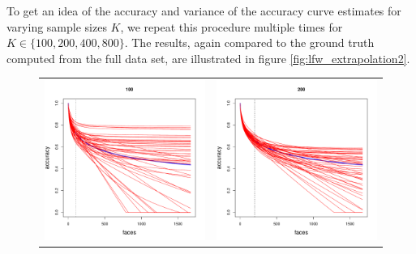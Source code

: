 \documentclass[12pt]{article}
\begin{document}
To get an idea of the accuracy and variance of the accuracy curve
estimates for varying sample sizes $K$, we repeat this procedure
multiple times for $K \in \{100,200,400, 800\}$.  The results, again
compared to the ground truth computed from the full data set, are
illustrated in figure \ref{fig:lfw_extrapolation2}.

\begin{figure}
\centering
\begin{tabular}{cc}
\includegraphics[scale = 0.4]{sub_100.pdf} &
\includegraphics[scale = 0.4]{sub_200.pdf} \\

\end{tabular}
\end{figure}
\end{document}
